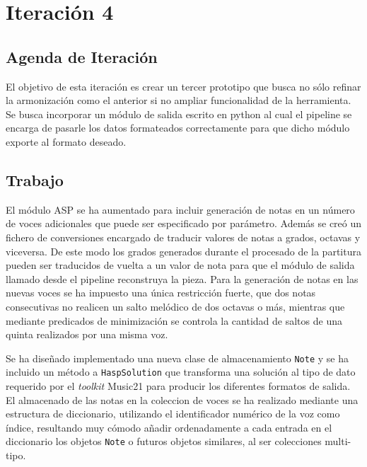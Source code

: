 \section{Iteración 4}
\label{sec:fourth_iteration}
\subsection{Agenda de Iteración}
\label{subsec:fourth_iteration_backlog}
El objetivo de esta iteración es crear un tercer prototipo que busca no sólo refinar la armonización como el anterior si no ampliar funcionalidad de la herramienta. Se busca incorporar un módulo de salida escrito en python al cual el pipeline se encarga de pasarle los datos formateados correctamente para que dicho módulo exporte al formato deseado. 

\subsection{Trabajo}
\label{subsec:fourth_iteration_work}
El módulo ASP se ha aumentado para incluir generación de notas en un número de voces adicionales que puede ser especificado por parámetro. Además se creó un fichero de conversiones encargado de traducir valores de notas a grados, octavas y viceversa. De este modo los grados generados durante el procesado de la partitura pueden ser traducidos de vuelta a un valor de nota para que el módulo de salida llamado desde el pipeline reconstruya la pieza. Para la generación de notas en las nuevas voces se ha impuesto una única restricción fuerte, que dos notas consecutivas no realicen un salto melódico de dos octavas o más, mientras que mediante predicados de minimización se controla la cantidad de saltos de una quinta realizados por una misma voz.

Se ha diseñado implementado una nueva clase de almacenamiento \texttt{Note} y se ha incluido un método a \texttt{HaspSolution} que transforma una solución al tipo de dato requerido por el \textit{toolkit} Music21 para producir los diferentes formatos de salida. El almacenado de las notas en la coleccion de voces se ha realizado mediante una estructura de diccionario, utilizando el identificador numérico de la voz como índice, resultando muy cómodo añadir ordenadamente a cada entrada en el diccionario los objetos \texttt{Note} o futuros objetos similares, al ser colecciones multi-tipo.

